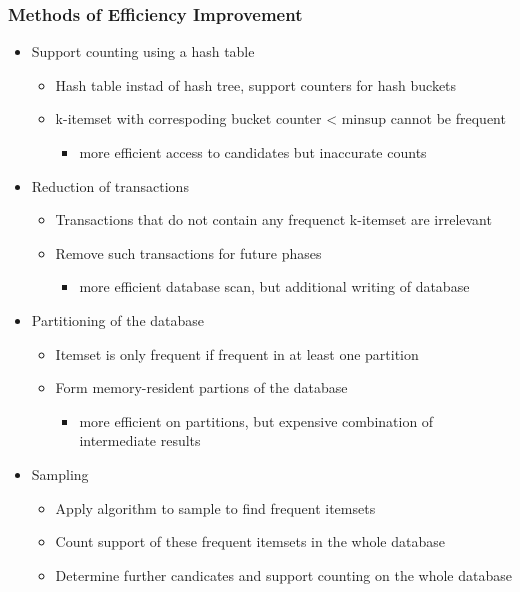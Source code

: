 \documentclass[../notes.tex]{subfiles}
\begin{document}
\subsubsection{Methods of Efficiency Improvement}
\begin{itemize}
  \item Support counting using a hash table
  \begin{itemize}
    \item Hash table instad of hash tree, support counters for hash buckets
    \item k-itemset with correspoding bucket counter < minsup cannot be frequent
    \begin{itemize}
      \item more efficient access to candidates but inaccurate counts
    \end{itemize}
  \end{itemize}

  \item Reduction of transactions
  \begin{itemize}
    \item Transactions that do not contain any frequenct k-itemset are irrelevant
    \item Remove such transactions for future phases
    \begin{itemize}
      \item more efficient database scan, but additional writing of database
    \end{itemize}
  \end{itemize}

  \item Partitioning of the database
  \begin{itemize}
    \item Itemset is only frequent if frequent in at least one partition
    \item Form memory-resident partions of the database
    \begin{itemize}
      \item more efficient on partitions, but expensive combination of intermediate results
    \end{itemize}
  \end{itemize}

  \item Sampling
  \begin{itemize}
    \item Apply algorithm to sample to find frequent itemsets
    \item Count support of these frequent itemsets in the whole database
    \item Determine further candicates and support counting on the whole database
  \end{itemize}
\end{itemize}
\end{document}
